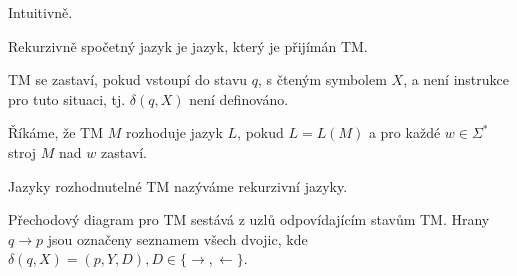 \documentclass[12pt]{article}                   %
\begin{document}
    \begin{definice}
        Intuitivně.
    \end{definice}

    \begin{definice}
        Rekurzivně spočetný jazyk je jazyk, který je přijímán TM.
    \end{definice}

    \begin{definice}[TM se zastaví]
        TM se zastaví, pokud vstoupí do stavu $q$, s čteným symbolem $X$, a není instrukce pro tuto situaci, tj. $\delta(q, X)$ není definováno.
    \end{definice}

    \begin{definice}
        Říkáme, že TM $M$ rozhoduje jazyk $L$, pokud $L = L(M)$ a pro každé $w \in \Sigma^*$ stroj $M$ nad $w$ zastaví.

        Jazyky rozhodnutelné TM nazýváme rekurzivní jazyky.
    \end{definice}

    \begin{definice}
        Přechodový diagram pro TM sestává z uzlů odpovídajícím stavům TM. Hrany $q \rightarrow p$ jsou označeny seznamem všech dvojic, kde $\delta(q, X) = (p, Y, D), D \in \{\rightarrow, \leftarrow\}$.
    \end{definice}
\end{document}
